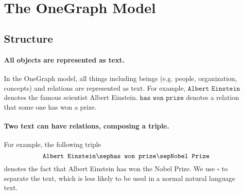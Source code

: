 \section{The OneGraph Model}
\label{sec:data-model}
\begin{table}[]
    \centering
    \caption{Vocabulary.}
    \label{tab:vocabulary}
\end{table}
\subsection{Structure}
\paragraph{All objects are represented as text.} In the OneGraph model, all things including beings (e.g. people, organization, concepts) and relations are represented as text. For example, $\texttt{Albert Einstein}$ denotes the famous scientist Albert Einstein. $\texttt{has won prize}$ denotes a relation that some one has won a prize. 

\paragraph{Two text can have relations, composing a triple.} For example, the following triple
$$ \texttt{Albert Einstein} \sep \texttt{has won prize} \sep \texttt{Nobel Prize}  $$
denotes the fact that Albert Einstein has won the Nobel Prize. We use $\square$ to separate the text, which is less likely to be used in a normal natural language text. 

